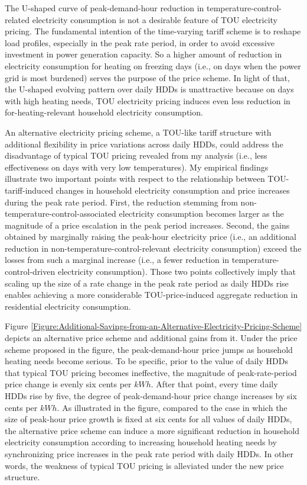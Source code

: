 The U-shaped curve of peak-demand-hour reduction in temperature-control-related electricity consumption is not a desirable feature of TOU electricity pricing. The fundamental intention of the time-varying tariff scheme is to reshape load profiles, especially in the peak rate period, in order to avoid excessive investment in power generation capacity. So a higher amount of reduction in electricity consumption for heating on freezing days (i.e., on days when the power grid is most burdened) serves the purpose of the price scheme. In light of that, the U-shaped evolving pattern over daily HDDs is unattractive because on days with high heating needs, TOU electricity pricing induces even less reduction in for-heating-relevant household electricity consumption. 

An alternative electricity pricing scheme, a TOU-like tariff structure with additional flexibility in price variations across daily HDDs, could address the disadvantage of typical TOU pricing revealed from my analysis (i.e., less effectiveness on days with very low temperatures). My empirical findings illustrate two important points with respect to the relationship between TOU-tariff-induced changes in household electricity consumption and price increases during the peak rate period. First, the reduction stemming from non-temperature-control-associated electricity consumption becomes larger as the magnitude of a price escalation in the peak period increases. Second, the gains obtained by marginally raising the peak-hour electricity price (i.e., an additional reduction in non-temperature-control-relevant electricity consumption) exceed the losses from such a marginal increase (i.e., a fewer reduction in temperature-control-driven electricity consumption). Those two points collectively imply that scaling up the size of a rate change in the peak rate period as daily HDDs rise enables achieving a more considerable TOU-price-induced aggregate reduction in residential electricity consumption. 
 
Figure \ref{Figure:Additional-Savings-from-an-Alternative-Electricity-Pricing-Scheme} depicts an alternative price scheme and additional gains from it. Under the price scheme proposed in the figure, the peak-demand-hour price jumps as household heating needs become serious. To be specific, prior to the value of daily HDDs that typical TOU pricing becomes ineffective, the magnitude of peak-rate-period price change is evenly six cents per $kWh$. After that point, every time daily HDDs rise by five, the degree of peak-demand-hour price change increases by six cents per $kWh$. As illustrated in the figure, compared to the case in which the size of peak-hour price growth is fixed at six cents for all values of daily HDDs, the alternative price scheme can induce a more significant reduction in household electricity consumption according to increasing household heating needs by synchronizing price increases in the peak rate period with daily HDDs. In other words, the weakness of typical TOU pricing is alleviated under the new price structure. 

